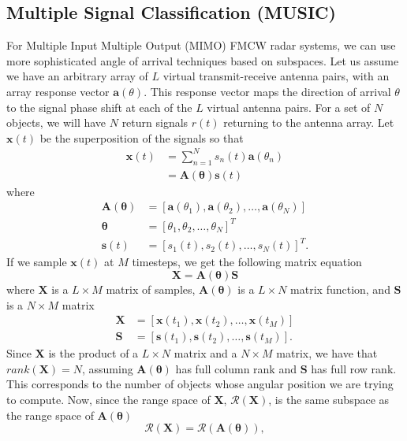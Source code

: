 \subsection{Multiple Signal Classification (MUSIC)}
For Multiple Input Multiple Output (MIMO) FMCW radar systems, we can use more
sophisticated angle of arrival techniques based on subspaces. Let
us assume we have an arbitrary array of $L$ virtual transmit-receive antenna pairs, with an
array response vector $\bm{a}(\theta)$. This response vector maps the direction
of arrival $\theta$ to the signal phase shift at each of the $L$ virtual antenna
pairs. For a set of $N$ objects, we will have $N$ return signals $r(t)$
returning to the antenna array. Let $\bm{x}(t)$ be the superposition of the
signals so that \cite{bresler2017hilbert}
\begin{align}
	\bm{x}(t) &= \sum_{n=1}^N s_n(t) \bm{a}(\theta_n)\\
	&= \bm{A}(\bm{\theta})\bm{s}(t)
\end{align}
where
\begin{align}
	\bm{A}(\bm{\theta}) &= [\bm{a}(\theta_1), \bm{a}(\theta_2), \dots, \bm{a}(\theta_N)]\\
	\bm{\theta} &= [\theta_1, \theta_2, \dots, \theta_N]^T\\
	\bm{s}(t) &= [s_1(t), s_2(t), \dots, s_N(t)]^T.
\end{align}
If we sample $\bm{x}(t)$ at $M$ timesteps, we get the following matrix equation
\begin{equation}
	\bm{X} = \bm{A}(\bm{\theta})\bm{S}
\end{equation}
where $\bm{X}$ is a $L \times M$ matrix of samples, $\bm{A}(\bm{\theta})$ is a
$L\times N$ matrix function, and $\bm{S}$ is a $N\times M$ matrix
\begin{align}
	\bm{X} &= [\bm{x}(t_1), \bm{x}(t_2), \dots, \bm{x}(t_M)]\\
	\bm{S} &= [\bm{s}(t_1), \bm{s}(t_2), \dots, \bm{s}(t_M)].
\end{align}
Since $\bm{X}$ is the product of a $L\times N$ matrix and a $N\times M$ matrix,
we have that $rank(\bm{X}) = N$, assuming $\bm{A}(\bm{\theta})$ has full column
rank and $\bm{S}$ has full row rank. This corresponds to the number of objects
whose angular position we are trying to compute. Now, since the range space of
$\bm{X}$, $\mathcal{R}(\bm{X})$, is the same subspace as the range space of
$\bm{A}(\bm{\theta})$
\begin{equation}
	\mathcal{R}(\bm{X}) = \mathcal{R}(\bm{A}(\bm{\theta})),
\end{equation}
